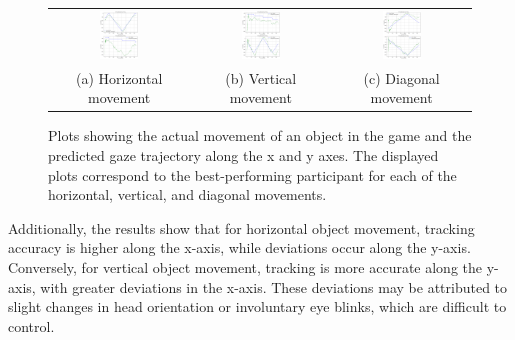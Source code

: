 \documentclass[10pt,a4paper,twoside]{article}
\begin{document}
\begin{figure}[h]
    \centering
    \begin{tabular}{ccc}
        \includegraphics[width=0.3\textwidth]{image/horizontal.png} &
        \includegraphics[width=0.3\textwidth]{image/vertical.png} &
        \includegraphics[width=0.3\textwidth]{image/diagonal.png} \\
        (a) Horizontal movement & (b) Vertical movement & (c) Diagonal movement
    \end{tabular}
    \caption{Plots showing the actual movement of an object in the game and the predicted gaze trajectory along the x and y axes. The displayed plots correspond to the best-performing participant for each of the horizontal, vertical, and diagonal movements.}
    \label{fig:plot}
\end{figure}

Additionally, the results show that for horizontal object movement, tracking accuracy is higher along the x-axis, while deviations occur along the y-axis. Conversely, for vertical object movement, tracking is more accurate along the y-axis, with greater deviations in the x-axis. These deviations may be attributed to slight changes in head orientation or involuntary eye blinks, which are difficult to control.
\end{document}
